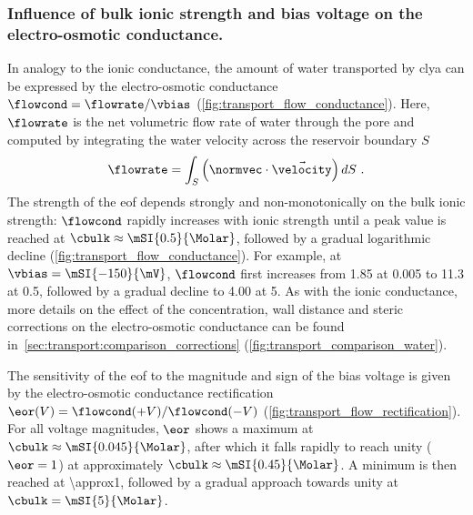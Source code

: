 \subsubsection{Influence of bulk ionic strength and bias voltage on the electro-osmotic conductance.}
%
In analogy to the ionic conductance, the amount of water transported by \gls{clya} can be expressed by the
electro-osmotic conductance $\flowcond = \flowrate / \vbias$ (\cref{fig:transport_flow_conductance}). Here,
$\flowrate$ is the net volumetric flow rate of water through the pore and computed by integrating the water
velocity across the reservoir boundary $S$
%
\begin{align}\label{eq:flowrate}
  \flowrate = \int_{S}\left(\normvec\cdot\vec{\velocity}\right)dS
  \text{ .}
\end{align}
%
The strength of the \gls{eof} depends strongly and non-monotonically on the bulk ionic strength: $\flowcond$
rapidly increases with ionic strength until a peak value is reached at $\cbulk \approx \mSI{0.5}{\Molar}$,
followed by a gradual logarithmic decline (\cref{fig:transport_flow_conductance}). For example, at $\vbias =
\mSI{-150}{\mV}$, $\flowcond$ first increases from \SI{1.85}{\cnmpnspv} at \SI{0.005}{\Molar} to
\SI{11.3}{\cnmpnspv} at \SI{0.5}{\Molar}, followed by a gradual decline to \SI{4.00}{\cnmpnspv} at
\SI{5}{\Molar}. As with the ionic conductance, more details on the effect of the concentration, wall distance
and steric corrections on the electro-osmotic conductance can be found
in~\cref{sec:transport:comparison_corrections} (\cref{fig:transport_comparison_water}).

The sensitivity of the \gls{eof} to the magnitude and sign of the bias voltage is given by the electro-osmotic
conductance rectification $\eor(V) = \flowcond (+V) / \flowcond (-V)$
(\cref{fig:transport_flow_rectification}). For all voltage magnitudes, $\eor$ shows a maximum at $\cbulk
\approx \mSI{0.045}{\Molar}$, after which it falls rapidly to reach unity ($\eor = 1$) at approximately
$\cbulk \approx \mSI{0.45}{\Molar}$. A minimum is then reached at \SI{\approx1}{\Molar}, followed by a gradual
approach towards unity at $\cbulk = \mSI{5}{\Molar}$.


